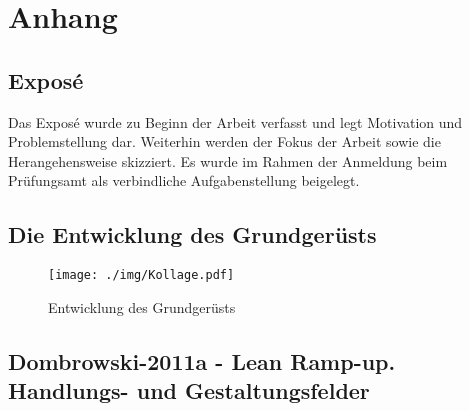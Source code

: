 \chapter{Anhang}
\section{Exposé}
Das Exposé wurde zu Beginn der Arbeit verfasst und legt Motivation und Problemstellung dar. Weiterhin werden der Fokus der Arbeit sowie die Herangehensweise skizziert. Es wurde im Rahmen der Anmeldung beim Prüfungsamt als verbindliche Aufgabenstellung beigelegt. 

\section{Die Entwicklung des Grundgerüsts}
\begin{figure}[ht]
 \centering
 \texttt{[image: ./img/Kollage.pdf]}
 \caption{Entwicklung des Grundgerüsts}
 \label{fig:kollage}
\end{figure}

\clearpage
\restoregeometry

\section{Dombrowski-2011a - Lean Ramp-up. Handlungs- und Gestaltungsfelder}
